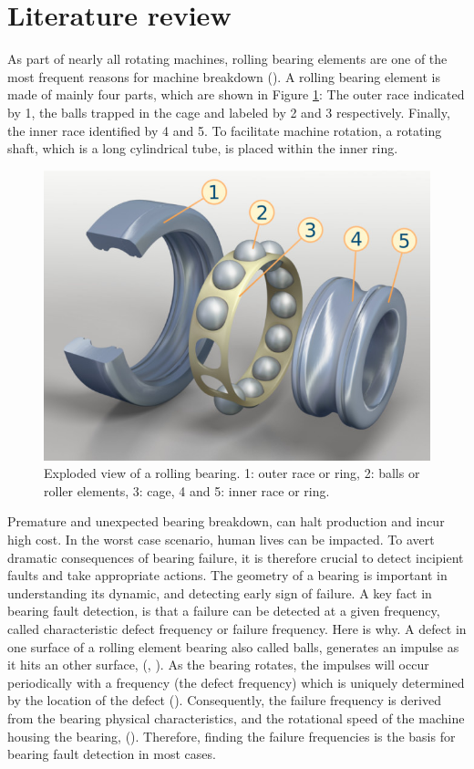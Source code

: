 \documentclass[../Main/thesis.tex]{subfiles}
\begin{document}
\section{Literature review}
\label{sec:relatedwork}
As part of nearly all rotating machines, rolling bearing elements are one of the most frequent reasons for machine breakdown (\cite{randal2010}). A rolling bearing element is made of mainly four parts, which are shown in Figure \ref{fig:bearing-s}: The outer race indicated by 1, the balls trapped in the cage and labeled by 2 and 3 respectively. Finally, the inner race identified by 4 and 5. To facilitate machine rotation, a rotating shaft, which is a long cylindrical tube, is placed within the inner ring.
\begin{figure}[H]
	\centering
	\includegraphics[width=0.5\linewidth]{../fig/bearing-s}
	\caption{Exploded view of a rolling bearing. 1: outer race or ring, 2: balls or roller elements, 3: cage, 4 and 5: inner race or ring.}
	\label{fig:bearing-s}
\end{figure}
\justify
Premature and unexpected bearing breakdown, can halt production and incur high cost. In the worst case scenario, human lives can be impacted. To avert dramatic consequences of bearing failure, it is therefore crucial to detect incipient faults and take appropriate actions.
\justify
The geometry of a bearing is important in understanding its dynamic, and detecting early sign of failure.
 A key fact in bearing fault detection, is that a failure can be detected at a given frequency, called characteristic defect frequency or failure frequency. Here is why. A defect in one surface of a rolling element bearing also called balls, generates an impulse as it hits an other surface, (\cite{mcfadden1984a}, \cite{mcfadden1984b}). As the bearing rotates, the impulses will occur periodically with a frequency (the defect frequency) which is uniquely determined by the location of the defect (\cite{mcfadden1984a}). Consequently, the failure frequency is derived from the bearing physical characteristics, and the rotational speed of the machine housing the bearing, (\cite{mcfadden1984a}). Therefore, finding the failure frequencies is the basis for bearing fault detection in most cases.
\end{document}

